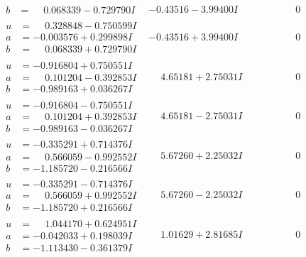 \documentclass[1p]{elsarticle_modified}
\theoremstyle{definition}
\begin{document}
$$\begin{array}{c|c|c}
\begin{aligned}
b &= \phantom{-}0.068339 - 0.729790 I\end{aligned}
 & -0.43516 - 3.99400 I & \phantom{-0.000000 } 0 \\ \hline\begin{aligned}
u &= \phantom{-}0.328848 - 0.750599 I \\
a &= -0.003576 + 0.299898 I \\
b &= \phantom{-}0.068339 + 0.729790 I\end{aligned}
 & -0.43516 + 3.99400 I & \phantom{-0.000000 } 0 \\ \hline\begin{aligned}
u &= -0.916804 + 0.750551 I \\
a &= \phantom{-}0.101204 - 0.392853 I \\
b &= -0.989163 + 0.036267 I\end{aligned}
 & \phantom{-}4.65181 + 2.75031 I & \phantom{-0.000000 } 0 \\ \hline\begin{aligned}
u &= -0.916804 - 0.750551 I \\
a &= \phantom{-}0.101204 + 0.392853 I \\
b &= -0.989163 - 0.036267 I\end{aligned}
 & \phantom{-}4.65181 - 2.75031 I & \phantom{-0.000000 } 0 \\ \hline\begin{aligned}
u &= -0.335291 + 0.714376 I \\
a &= \phantom{-}0.566059 - 0.992552 I \\
b &= -1.185720 - 0.216566 I\end{aligned}
 & \phantom{-}5.67260 + 2.25032 I & \phantom{-0.000000 } 0 \\ \hline\begin{aligned}
u &= -0.335291 - 0.714376 I \\
a &= \phantom{-}0.566059 + 0.992552 I \\
b &= -1.185720 + 0.216566 I\end{aligned}
 & \phantom{-}5.67260 - 2.25032 I & \phantom{-0.000000 } 0 \\ \hline\begin{aligned}
u &= \phantom{-}1.044170 + 0.624951 I \\
a &= -0.042033 + 0.198039 I \\
b &= -1.113430 - 0.361379 I\end{aligned}
 & \phantom{-}1.01629 + 2.81685 I & \phantom{-0.000000 } 0 \\ \hline\begin{aligned}

\end{aligned}
\end{array}$$
\end{document}
